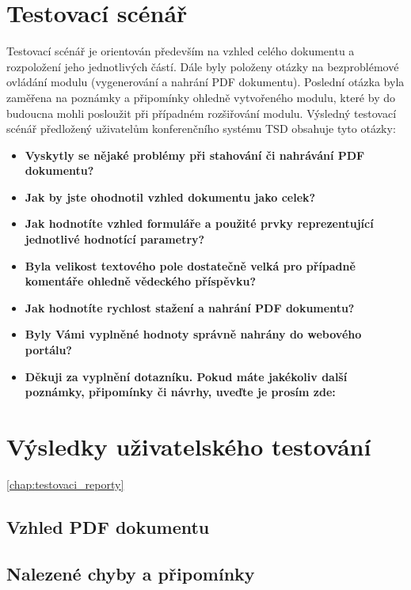 \section{Testovací scénář}
Testovací scénář je orientován především na vzhled celého dokumentu a rozpoložení jeho jednotlivých částí. Dále byly položeny otázky na bezproblémové ovládání modulu (vygenerování a nahrání PDF dokumentu). Poslední otázka byla zaměřena na poznámky a připomínky ohledně vytvořeného modulu, které by do budoucna mohli posloužit při případném rozšiřování modulu.
Výsledný testovací scénář předložený uživatelům konferenčního systému TSD obsahuje tyto otázky:
\begin{itemize}
	\item \textbf{Vyskytly se nějaké problémy při stahování či nahrávání PDF dokumentu?}
	\item \textbf{Jak by jste ohodnotil vzhled dokumentu jako celek?}
	\item \textbf{Jak hodnotíte vzhled formuláře a použité prvky reprezentující jednotlivé hodnotící parametry?}
	\item \textbf{Byla velikost textového pole dostatečně velká pro případně komentáře ohledně vědeckého příspěvku?}
	\item \textbf{Jak hodnotíte rychlost stažení a nahrání PDF dokumentu?} 
	\item \textbf{Byly Vámi vyplněné hodnoty správně nahrány do webového portálu?}
	\item \textbf{Děkuji za vyplnění dotazníku. Pokud máte jakékoliv další poznámky, připomínky či návrhy, uveďte je prosím zde:}
\end{itemize}

\section{Výsledky uživatelského testování}
\ref{chap:testovaci_reporty}
\subsection{Vzhled PDF dokumentu}
\subsection{Nalezené chyby a připomínky}

 